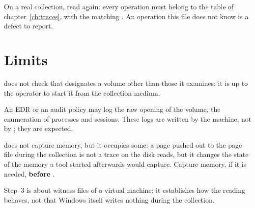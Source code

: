 \documentclass[11pt,a4paper,oneside]{report}
\begin{document}
On a real collection, read  again: every operation
must belong to the table of chapter~\ref{ch:traces}, with the matching
. An operation this file does not know is a defect to
report.

\chapter{Limits}

\begin{description}[style=nextline,leftmargin=1.2em]
  \item[Output folder] \wac{} does not check that  designates a
        volume other than those it examines: it is up to the operator to start
        it from the collection medium.
  \item[Monitoring] An EDR or an audit policy may log the raw opening of the
        volume, the enumeration of processes and sessions. These logs are
        written by the machine, not by \wac{}; they are expected.
  \item[Memory] \wac{} does not capture memory, but it occupies some: a page
        pushed out to the page file during the collection is not a trace on
        the disk \wac{} reads, but it changes the state of the memory a tool
        started afterwards would capture. Capture memory, if it is needed,
        \textbf{before} \wac{}.
  \item[Measurement] Step~3 is about witness files of a virtual machine: it
        establishes how the reading behaves, not that Windows itself writes
        nothing during the collection.
\end{description}
\end{document}
